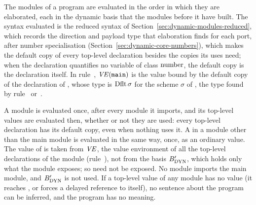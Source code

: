The modules of a program are evaluated in the order in which they are
elaborated, each in the dynamic basis that the modules before it have built.
The syntax evaluated is the reduced syntax of
Section~\ref{sec:dynamic-modules-reduced}, which records the direction and
payload type that elaboration finds for each port, after number
specialisation (Section~\ref{sec:dynamic-core-numbers}), which makes the
default copy of every top-level declaration besides the copies its uses
need; when the declaration quantifies no variable of class $\mathrm{number}$, the
default copy is the declaration itself. In rule~,
$\mathit{VE}(\textnormal{\texttt{main}})$ is the value bound by the default copy of the declaration of
, whose type is $\mathrm{Dflt}\,\sigma$ for the scheme $\sigma$ of ,
the type found by rule~
or~. %


  {}

  {}

\begin{rulecomments}
 A module is evaluated once, after every module it
imports, and its top-level values are evaluated then, whether or not they are
used: every top-level declaration has its default copy, even when nothing
uses it. A  in a module other than the main module is evaluated in the
same way, once, as an ordinary value. %
 The value of  is taken from $\mathit{VE}$, the value
environment of all the top-level declarations of the module
(rule~), not from the basis $B_{\mathrm{DYN}}'$, which holds only
what the module exposes; so  need not be exposed. No module imports
the main module, and $B_{\mathrm{DYN}}'$ is not used. %
If a top-level value of any module has no value (it reaches
, or forces a delayed reference to itself), no sentence about
the program can be inferred, and the program has no meaning. %
\end{rulecomments}


  {}

